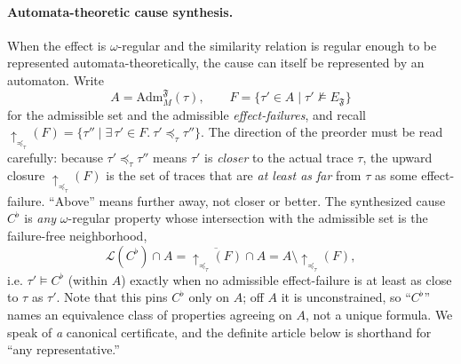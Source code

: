 \documentclass[11pt]{article}
\theoremstyle{remark}
\newcommand{\Lang}{\mathcal{L}}
\newcommand{\Frame}{\mathfrak{F}}
\newcommand{\Adm}{\mathrm{Adm}}
\begin{document}
\paragraph{Automata-theoretic cause synthesis.}
When the effect is \(\omega\)-regular and the similarity relation is regular
enough to be represented automata-theoretically, the cause can itself be
represented by an automaton. Write
\[
  A=\Adm_M^{\Frame}(\tau),
  \qquad
  F=\{\tau'\in A\mid \tau'\not\models E_{\Frame}\}
\]
for the admissible set and the admissible \emph{effect-failures}, and recall
\(\uparrow_{\preceq_\tau}(F)=\{\tau''\mid\exists\,\tau'\in F.\ \tau'\preceq_\tau\tau''\}\).
The direction of the preorder must be read carefully: because
\(\tau'\preceq_\tau\tau''\) means \(\tau'\) is \emph{closer} to the actual trace
\(\tau\), the upward closure \(\uparrow_{\preceq_\tau}(F)\) is the set of
traces that are \emph{at least as far} from \(\tau\) as some effect-failure.
``Above'' means further away, not closer or better. The synthesized
cause \(C^{\flat}\) is \emph{any} \(\omega\)-regular property whose intersection
with the admissible set is the failure-free neighborhood,
\[
  \Lang(C^{\flat}) \cap A
  =
  \overline{\uparrow_{\preceq_\tau}(F)} \cap A
  =
  A\setminus\uparrow_{\preceq_\tau}(F),
\]
i.e. \(\tau'\models C^{\flat}\) (within \(A\)) exactly when no admissible
effect-failure is at least as close to \(\tau\) as \(\tau'\). Note that this pins
\(C^{\flat}\) only on \(A\); off \(A\) it is unconstrained, so ``\(C^{\flat}\)''
names an equivalence class of properties agreeing on \(A\), not a unique formula.
We speak of \emph{a} canonical certificate, and the definite article below is
shorthand for ``any representative.''
\end{document}
